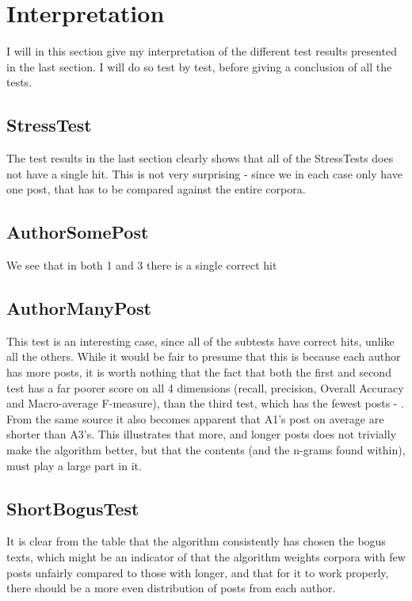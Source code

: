 \section{Interpretation}
\label{interpretation}
I will in this section give my interpretation of the different test results presented in the last section. I will do so test by test, before giving a conclusion of all the tests.

\subsection{StressTest}
The test results in the last section clearly shows that all of the StressTests does not have a single hit. This is not very surprising - since we in each case only have one post, that has to be compared against the entire corpora.

\subsection{AuthorSomePost}
We see that in both 1 and 3 there is a single correct hit

\subsection{AuthorManyPost}
This test is an interesting case, since all of the subtests have correct hits, unlike all the others. While it would be fair to presume that this is because each author has more posts, it is worth nothing that the fact that both the first and second test has a far poorer score on all 4 dimensions (recall, precision, Overall Accuracy and Macro-average F-measure), than the third test, which has the fewest posts - . From the same source it also becomes apparent that A1's post on average are shorter than A3's. This illustrates that more, and longer posts does not trivially make the algorithm better, but that the contents (and the n-grams found within), must play a large part in it.

\subsection{ShortBogusTest}
It is clear from the table that the algorithm consistently has chosen the bogus texts, which might be an indicator of that the algorithm weights corpora with few posts unfairly compared to those with longer, and that for it to work properly, there should be a more even distribution of posts from each author.\\

